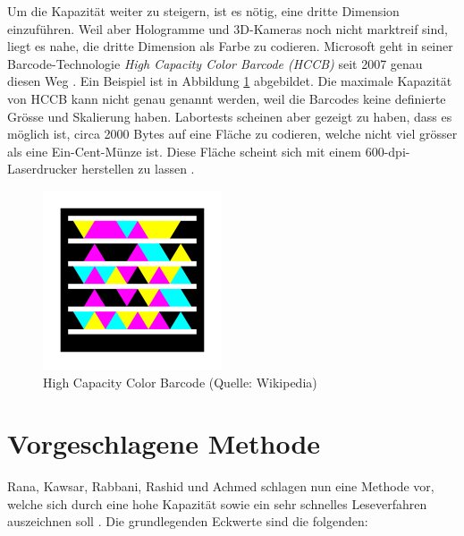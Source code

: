 \documentclass[11pt]{scrreprt} %
\theoremstyle{definition}
\begin{document}
Um die Kapazität weiter zu steigern, ist es nötig, eine dritte Dimension einzuführen. Weil aber Hologramme und 3D-Kameras noch nicht marktreif sind, liegt es nahe, die dritte Dimension als Farbe zu codieren. Microsoft geht in seiner Barcode-Technologie {\it High Capacity Color Barcode (HCCB)} seit 2007 \cite{wiki:hccb} genau diesen Weg \cite{ms:hccb}. Ein Beispiel ist in Abbildung \ref{fig:hccb} abgebildet. Die maximale Kapazität von HCCB kann nicht genau genannt werden, weil die Barcodes keine definierte Grösse und Skalierung haben. Labortests scheinen aber gezeigt zu haben, dass es möglich ist, circa 2000 Bytes auf eine Fläche zu codieren, welche nicht viel grösser als eine Ein-Cent-Münze ist. Diese Fläche scheint sich mit einem 600-dpi-Laserdrucker herstellen zu lassen \cite{ms:hccb}.


\begin{figure}
\caption{High Capacity Color Barcode (Quelle: Wikipedia)}
\label{fig:hccb}
\begin{center}
\includegraphics[scale=0.4]{biltli/hccb.png}
\end{center}
\end{figure}

\section{Vorgeschlagene Methode}

Rana, Kawsar, Rabbani, Rashid und Achmed schlagen nun eine Methode vor, welche sich durch eine hohe Kapazität sowie ein sehr schnelles Leseverfahren auszeichnen soll \cite{paper}. Die grundlegenden Eckwerte sind die folgenden:
\end{document}
